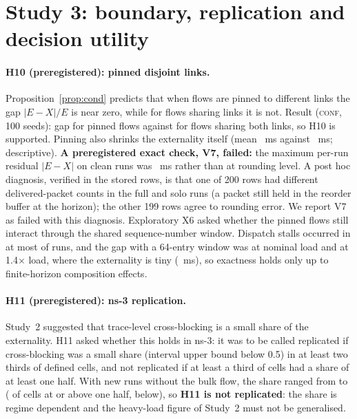 \documentclass[11pt]{article}
\newcommand{\tagC}{\textsc{conf}}
\begin{document}
\section{Study 3: boundary, replication and decision utility}\label{sec:s3}
\paragraph{H10 (preregistered): pinned disjoint links.} Proposition~\ref{prop:cond} predicts that when flows are pinned to different links the gap $|E-X|/E$ is near zero, while for flows sharing links it is not. Result (\tagC{}, 100 seeds): gap \TenGapPinned{} \TenGapPinnedCI{} for pinned flows against \TenGapShared{} \TenGapSharedCI{} for flows sharing both links, so H10 is supported. Pinning also shrinks the externality itself (mean \TenEPinned{}~ms against \TenESharedF{}~ms; descriptive). \textbf{A preregistered exact check, V7, failed:} the maximum per-run residual $|E-X|$ on clean runs was \TenVSeven{}~ms rather than at rounding level. A post hoc diagnosis, verified in the stored rows, is that one of 200 rows had different delivered-packet counts in the full and solo runs (a packet still held in the reorder buffer at the horizon); the other 199 rows agree to rounding error. We report V7 as failed with this diagnosis.
Exploratory X6 asked whether the pinned flows still interact through the shared sequence-number window. Dispatch stalls occurred in at most \SXSixMaxStall{} of runs, and the gap with a 64-entry window was \SXSixGapLow{} at nominal load and \SXSixGapHigh{} \SXSixGapHighCI{} at 1.4$\times$ load, where the externality is tiny (\SXSixEHigh{}~ms), so exactness holds only up to finite-horizon composition effects.

\paragraph{H11 (preregistered): ns-3 replication.} Study~2 suggested that trace-level cross-blocking is a small share of the externality. H11 asked whether this holds in ns-3: it was to be called replicated if cross-blocking was a small share (interval upper bound below 0.5) in at least two thirds of defined cells, and not replicated if at least a third of cells had a share of at least one half. With \ElevenRuns{} new runs without the bulk flow, the share ranged from \ElevenMin{} to \ElevenMax{} (\ElevenMostly{} of \ElevenDefined{} cells at or above one half, \ElevenLittle{} below), so \textbf{H11 is not replicated}: the share is regime dependent and the heavy-load figure of Study~2 must not be generalised.
\begin{table}[h]
\centering\small

\caption{Study 3, H11 (\tagC{}): externality of the bulk flow on the latency-sensitive flow and the share explained by trace-level cross-blocking, ns-3.47 FIFO, 30 seeds per arm. Intervals are bootstraps over seeds, arms resampled independently.}
\end{table}
\end{document}
